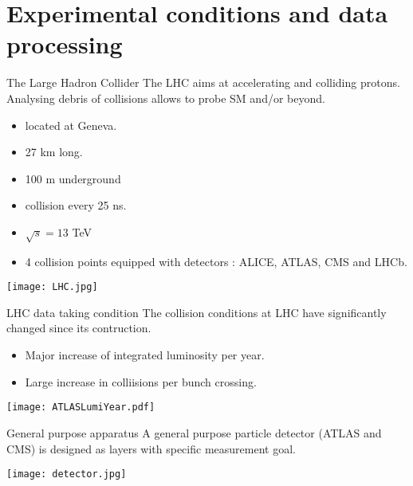 \section{Experimental conditions and data processing}
\frame{\tableofcontents[currentsection]}

\begin{frame}{The Large Hadron Collider}
  The LHC aims at accelerating and colliding protons.
  Analysing debris of collisions allows to probe SM and/or beyond.
  \vfill
  
  \begin{minipage}{0.49\linewidth}
    \begin{itemize}
    \item located at Geneva.
    \item 27 km long.
    \item 100 m underground
    \item collision every 25 ns.
    \item $\sqrt{s}=13$ TeV
    \item 4 collision points equipped with detectors : ALICE, ATLAS, CMS and LHCb.
    \end{itemize}
    \end{minipage}
  \hfill
  \begin{minipage}{0.49\linewidth}
    \texttt{[image: LHC.jpg]}
    \end{minipage}
\end{frame}
\begin{frame}{LHC data taking condition}
  The collision conditions at LHC have significantly changed since its contruction.
  \begin{itemize}
  \item Major increase of integrated luminosity per year.
  \item Large increase in colliisions per bunch crossing.
  \end{itemize}

  \begin{center} \texttt{[image: ATLASLumiYear.pdf]} \end{center}
\end{frame}
\begin{frame}{General purpose apparatus}
  A general purpose particle detector (ATLAS and CMS) is designed as layers with specific measurement goal.
  
  \begin{center}    \texttt{[image: detector.jpg]} \end{center}
\end{frame}

